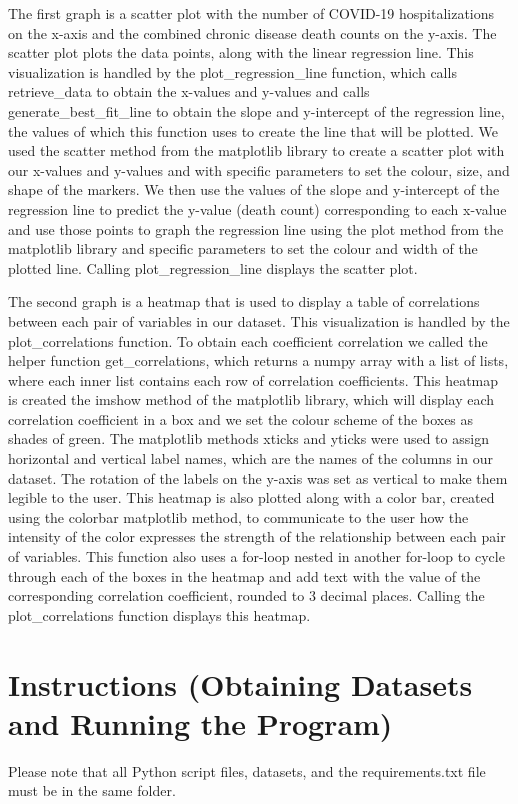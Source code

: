 \documentclass[fontsize=11pt]{article}
\begin{document}
\noindent
The first graph is a scatter plot with the number of COVID-19 hospitalizations on the x-axis and the combined chronic disease death counts on the y-axis. The scatter plot plots the data points, along with the linear regression line. This visualization is handled by the plot\_regression\_line function, which calls retrieve\_data to obtain the x-values and y-values and calls generate\_best\_fit\_line to obtain the slope and y-intercept of the regression line, the values of which this function uses to create the line that will be plotted. We used the scatter method from the matplotlib library to create a scatter plot with our x-values and y-values and with specific parameters to set the colour, size, and shape of the markers. We then use the values of the slope and y-intercept of the regression line to predict the y-value (death count) corresponding to each x-value and use those points to graph the regression line using the plot method from the matplotlib library and specific parameters to set the colour and width of the plotted line. Calling plot\_regression\_line displays the scatter plot.

\noindent
The second graph is a heatmap that is used to display a table of correlations between each pair of variables in our dataset. This visualization is handled by the plot\_correlations function. To obtain each coefficient correlation we called the helper function get\_correlations, which returns a numpy array with a list of lists, where each inner list contains each row of correlation coefficients. This heatmap is created the imshow method of the matplotlib library, which will display each correlation coefficient in a box and we set the colour scheme of the boxes as shades of green. The matplotlib methods xticks and yticks were used to assign horizontal and vertical label names, which are the names of the columns in our dataset. The rotation of the labels on the y-axis was set as vertical to make them legible to the user. This heatmap is also plotted along with a color bar, created using the colorbar matplotlib method, to communicate to the user how the intensity of the color expresses the strength of the relationship between each pair of variables. This function also uses a for-loop nested in another for-loop to cycle through each of the boxes in the heatmap and add text with the value of the corresponding correlation coefficient, rounded to 3 decimal places. Calling the plot\_correlations function displays this heatmap.


\section*{Instructions (Obtaining Datasets and Running the Program)}
Please note that all Python script files, datasets, and the requirements.txt file must be in the same folder.
\end{document}
